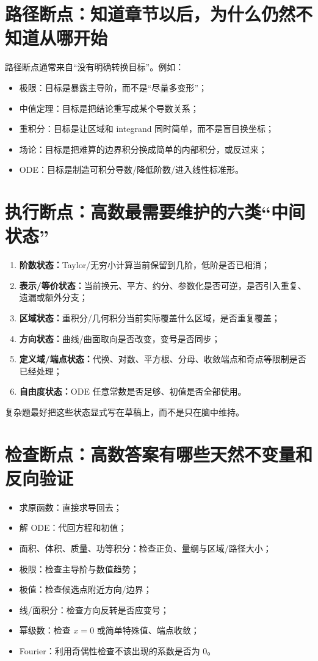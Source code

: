 \documentclass[11pt,a4paper,openany]{ctexbook}
\newcommand{\key}[1]{\textbf{\color{deep}#1}}
\begin{document}
\section{路径断点：知道章节以后，为什么仍然不知道从哪开始}
路径断点通常来自“没有明确转换目标”。例如：
\begin{itemize}
  \item 极限：目标是暴露主导阶，而不是“尽量多变形”；
  \item 中值定理：目标是把结论重写成某个导数关系；
  \item 重积分：目标是让区域和 integrand 同时简单，而不是盲目换坐标；
  \item 场论：目标是把难算的边界积分换成简单的内部积分，或反过来；
  \item ODE：目标是制造可积分导数/降低阶数/进入线性标准形。
\end{itemize}

\section{执行断点：高数最需要维护的六类“中间状态”}
\begin{enumerate}
  \item \key{阶数状态：}Taylor/无穷小计算当前保留到几阶，低阶是否已相消；
  \item \key{表示/等价状态：}当前换元、平方、约分、参数化是否可逆，是否引入重复、遗漏或额外分支；
  \item \key{区域状态：}重积分/几何积分当前实际覆盖什么区域，是否重复覆盖；
  \item \key{方向状态：}曲线/曲面取向是否改变，变号是否同步；
  \item \key{定义域/端点状态：}代换、对数、平方根、分母、收敛端点和奇点等限制是否已经处理；
  \item \key{自由度状态：}ODE 任意常数是否足够、初值是否全部使用。
\end{enumerate}
复杂题最好把这些状态显式写在草稿上，而不是只在脑中维持。

\section{检查断点：高数答案有哪些天然不变量和反向验证}
\begin{itemize}
  \item 求原函数：直接求导回去；
  \item 解 ODE：代回方程和初值；
  \item 面积、体积、质量、功等积分：检查正负、量纲与区域/路径大小；
  \item 极限：检查主导阶与数值趋势；
  \item 极值：检查候选点附近方向/边界；
  \item 线/面积分：检查方向反转是否应变号；
  \item 幂级数：检查 $x=0$ 或简单特殊值、端点收敛；
  \item Fourier：利用奇偶性检查不该出现的系数是否为 0。
\end{itemize}
\end{document}
